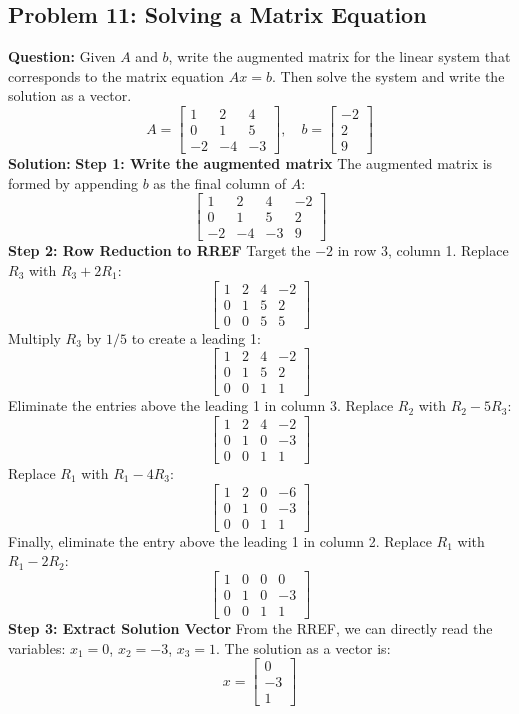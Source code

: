 \documentclass{article}
\begin{document}
\subsection{Problem 11: Solving a Matrix Equation}
\textbf{Question:} Given $A$ and $b$, write the augmented matrix for the linear system that corresponds to the matrix equation $Ax = b$. Then solve the system and write the solution as a vector.
\[ A = \begin{bmatrix} 1 & 2 & 4 \\ 0 & 1 & 5 \\ -2 & -4 & -3 \end{bmatrix}, \quad b = \begin{bmatrix} -2 \\ 2 \\ 9 \end{bmatrix} \]
\textbf{Solution:}
\textbf{Step 1: Write the augmented matrix}
The augmented matrix is formed by appending $b$ as the final column of $A$:
\[ \begin{bmatrix} 1 & 2 & 4 & -2 \\ 0 & 1 & 5 & 2 \\ -2 & -4 & -3 & 9 \end{bmatrix} \]
\textbf{Step 2: Row Reduction to RREF}
Target the $-2$ in row 3, column 1. Replace $R_3$ with $R_3 + 2R_1$:
\[ \begin{bmatrix} 1 & 2 & 4 & -2 \\ 0 & 1 & 5 & 2 \\ 0 & 0 & 5 & 5 \end{bmatrix} \]
Multiply $R_3$ by $1/5$ to create a leading 1:
\[ \begin{bmatrix} 1 & 2 & 4 & -2 \\ 0 & 1 & 5 & 2 \\ 0 & 0 & 1 & 1 \end{bmatrix} \]
Eliminate the entries above the leading 1 in column 3. 
Replace $R_2$ with $R_2 - 5R_3$:
\[ \begin{bmatrix} 1 & 2 & 4 & -2 \\ 0 & 1 & 0 & -3 \\ 0 & 0 & 1 & 1 \end{bmatrix} \]
Replace $R_1$ with $R_1 - 4R_3$:
\[ \begin{bmatrix} 1 & 2 & 0 & -6 \\ 0 & 1 & 0 & -3 \\ 0 & 0 & 1 & 1 \end{bmatrix} \]
Finally, eliminate the entry above the leading 1 in column 2.
Replace $R_1$ with $R_1 - 2R_2$:
\[ \begin{bmatrix} 1 & 0 & 0 & 0 \\ 0 & 1 & 0 & -3 \\ 0 & 0 & 1 & 1 \end{bmatrix} \]
\textbf{Step 3: Extract Solution Vector}
From the RREF, we can directly read the variables: $x_1 = 0$, $x_2 = -3$, $x_3 = 1$.
The solution as a vector is:
\[ x = \begin{bmatrix} 0 \\ -3 \\ 1 \end{bmatrix} \]
\end{document}
